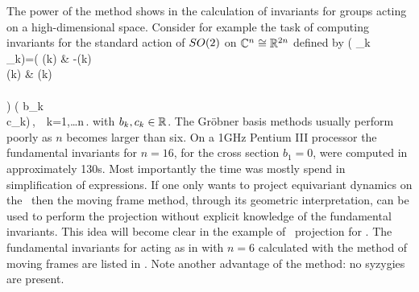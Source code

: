 The power of the method shows in the calculation of invariants for groups acting on
a high-dimensional space. Consider for example the
task of computing invariants for the standard action of $SO(2)$ on $\mathbb{C}^{n}\cong\mathbb{R}^{2n}$ defined by
\beq
	\left( _k \\ _k\earr \right)=\left(
			    			\cos(k\theta) & -\sin(k\theta)\\
						\sin(k\theta) & \cos(k\theta)\\
			   			\earr\\	
						\right) \left( b_k \\ c_k\earr\right)\,,\ \ k=1,\ldots n\,.
	\label{eq:SO2stand}
\eeq
with $b_k,c_k\in\mathbb{R}^{}$. The Gr\"{o}bner basis methods usually perform poorly as $n$ becomes larger than six. On a 1GHz Pentium III processor the fundamental invariants for $n=16$, for the cross
section $b_1=0$, were computed in approximately 130s. Most importantly the time was mostly
spend in simplification of expressions.
If one only wants to project equivariant dynamics on the \reducedsp\ then the moving frame method,
through its geometric interpretation, can be used to perform the projection without explicit knowledge of the fundamental invariants.
This idea will become clear in the example of \reducedsp\ projection
for \CLe. The fundamental invariants for  acting as in  with
$n=6$ calculated with the method of moving frames are listed in . Note another advantage of the method: no syzygies are present.


